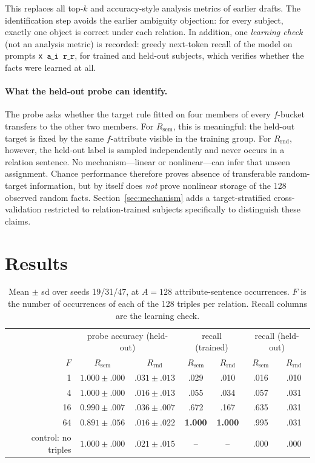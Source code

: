 \documentclass[11pt]{article}
\newcommand{\sep}{\texttt{x}}
\newcommand{\subj}[1]{\texttt{a\_#1}}
\newcommand{\rel}[1]{\texttt{r\_#1}}
\newcommand{\Rsem}{R_{\mathrm{sem}}}
\newcommand{\Rrnd}{R_{\mathrm{rnd}}}
\begin{document}
This replaces all top-$k$ and accuracy-style analysis metrics of earlier drafts. The identification step avoids the earlier ambiguity objection: for every subject, exactly one object is correct under each relation. In addition, one \emph{learning check} (not an analysis metric) is recorded: greedy next-token recall of the model on prompts \sep\ $\subj{i}$\ $\rel{r}$, for trained and held-out subjects, which verifies whether the facts were learned at all.

\paragraph{What the held-out probe can identify.}
The probe asks whether the target rule fitted on four members of every $f$-bucket transfers to the other two members. For $\Rsem$, this is meaningful: the held-out target is fixed by the same $f$-attribute visible in the training group. For $\Rrnd$, however, the held-out label is sampled independently and never occurs in a relation sentence. No mechanism---linear or nonlinear---can infer that unseen assignment. Chance performance therefore proves absence of transferable random-target information, but by itself does \emph{not} prove nonlinear storage of the 128 observed random facts. Section~\ref{sec:mechanism} adds a target-stratified cross-validation restricted to relation-trained subjects specifically to distinguish these claims.

\section{Results}

\begin{table}[h]
\centering
\begin{tabular}{rcccccc}
\toprule
 & \multicolumn{2}{c}{probe accuracy (held-out)} & \multicolumn{2}{c}{recall (trained)} & \multicolumn{2}{c}{recall (held-out)}\\
$F$ & $\Rsem$ & $\Rrnd$ & $\Rsem$ & $\Rrnd$ & $\Rsem$ & $\Rrnd$\\
\midrule
1  & $1.000 \pm .000$ & $.031 \pm .013$ & .029 & .010 & .016 & .010\\
4  & $1.000 \pm .000$ & $.016 \pm .013$ & .055 & .034 & .057 & .031\\
16 & $0.990 \pm .007$ & $.036 \pm .007$ & .672 & .167 & .635 & .031\\
64 & $0.891 \pm .056$ & $.016 \pm .022$ & \textbf{1.000} & \textbf{1.000} & .995 & .031\\
\midrule
control: no triples & $1.000 \pm .000$ & $.021 \pm .015$ & -- & -- & .000 & .000\\
\bottomrule
\end{tabular}
\caption{Mean $\pm$ sd over seeds 19/31/47, at $A{=}128$ attribute-sentence occurrences. $F$ is the number of occurrences of each of the 128 triples per relation. Recall columns are the learning check.}
\label{tab:main}
\end{table}
\end{document}
